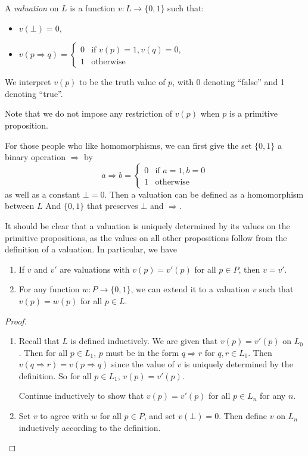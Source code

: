 \documentclass[a4paper]{article}
\begin{document}
\begin{defi}[Valuation]
  A \emph{valuation} on $L$ is a function $v: L\to \{0, 1\}$ such that:
  \begin{itemize}
  \item $v(\bot) = 0$,
  \item $v(p\Rightarrow q) = \begin{cases} 0 & \text{if }v(p) = 1, v(q) = 0,\\1 & \text{otherwise}\end{cases}$
  \end{itemize}
  We interpret $v(p)$ to be the truth value of $p$, with 0 denoting ``false'' and 1 denoting ``true''.

  Note that we do not impose any restriction of $v(p)$ when $p$ is a primitive proposition.
\end{defi}
For those people who like homomorphisms, we can first give the set $\{0, 1\}$ a binary operation $\Rightarrow $ by
\[
  a\Rightarrow b = \begin{cases}
    0 & \text{if }a = 1, b = 0\\
    1 & \text{otherwise}
  \end{cases}
\]
as well as a constant $\bot = 0$. Then a valuation can be defined as a homomorphism between $L$ And $\{0, 1\}$ that preserves $\bot$ and $\Rightarrow $.

It should be clear that a valuation is uniquely determined by its values on the primitive propositions, as the values on all other propositions follow from the definition of a valuation. In particular, we have
\begin{prop}\leavevmode
  \begin{enumerate}
    \item If $v$ and $v'$ are valuations with $v(p) = v'(p)$ for all $p\in P$, then $v = v'$.
    \item For any function $w: P \to \{0, 1\}$, we can extend it to a valuation $v$ such that $v(p) = w(p)$ for all $p\in L$.
  \end{enumerate}
\end{prop}

\begin{proof}\leavevmode
  \begin{enumerate}
    \item Recall that $L$ is defined inductively. We are given that $v(p) = v'(p)$ on $L_0$. Then for all $p\in L_1$, $p$ must be in the form $q\Rightarrow r$ for $q, r\in L_0$. Then $v(q\Rightarrow r) = v(p\Rightarrow q)$ since the value of $v$ is uniquely determined by the definition. So for all $p\in L_1$, $v(p) = v'(p)$.

      Continue inductively to show that $v(p) = v'(p)$ for all $p\in L_n$ for any $n$.

    \item Set $v$ to agree with $w$ for all $p\in P$, and set $v(\bot) = 0$. Then define $v$ on $L_n$ inductively according to the definition.
  \end{enumerate}
\end{proof}
\end{document}
